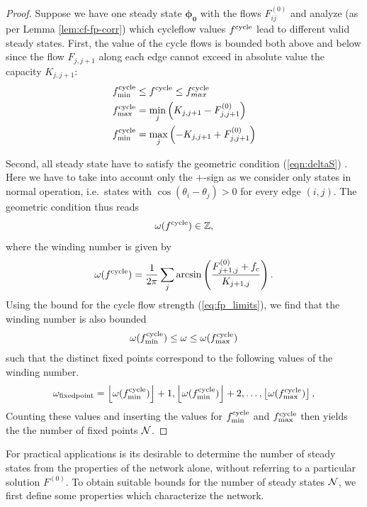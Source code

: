 \documentclass[10pt,aps,pre,preprint,superscriptaddress]{revtex4-1}
\newcommand{\be}{\begin{equation}}
\newcommand{\ee}{\end{equation}}
\newcommand{\N}{{\cal N}}
\renewcommand{\vec}[1]{\boldsymbol{#1}}
\newcommand{\floor}[1]{\left\lfloor #1 \right \rfloor}
\begin{document}
\begin{proof}
Suppose we have one steady state $\vec{\phi_0}$
with the flows $F_{ij}^{(0)}$ and analyze (as per Lemma \ref{lem:cf-fp-corr})
which cycleflow values $f^{\rm cycle}$ lead to different valid steady states. 
First, the value of the cycle flows is bounded both above and below
since the flow $F_{j,j+1}$ along each edge cannot exceed in 
absolute value the capacity $K_{j,j+1}$:
\begin{align}
  \label{eq:fp_limits}
  f^{\rm cycle}_{\min} & \leq f^{\rm cycle} \leq f^{\rm cycle}_{max}\\
  f^{\rm cycle}_{\max}&=\min_{j} \left(K_{j,j+1}-F^{(0)}_{j,j+1} \right)\\
  f^{\rm cycle}_{\min}&=\max_{j} \left(-K_{j,j+1}+F^{(0)}_{j,j+1} \right)\\
\end{align}

Second, all steady state have to satisfy the geometric condition (\ref{eqn:deltaS})  . 
Here we have to take into account only the $+$-sign as we consider only states in 
normal operation, i.e.~states with $\cos(\theta_i - \theta_j) > 0$ for every
edge $(i,j)$. The geometric condition thus reads
\be
    \omega(f^{\rm cycle}) \in \mathbb{Z},
\ee
where the winding number is given by
\be
   \omega(f^{\rm cycle}) = \frac{1}{2\pi} \sum_j\arcsin\left(\frac{F_{j+1,j}^{(0)}+f_c}{K_{j+1,j}}\right).
\ee
Using the bound for the cycle flow strength (\ref{eq:fp_limits}), we find that the winding 
number is also bounded
\begin{align}
   \omega(f^{\rm cycle}_{\min}) \le \omega \le \omega(f^{\rm cycle}_{\max})
  \label{eq:lim-omega}
\end{align}
such that the distinct fixed points correspond to the following values of the winding number. 
\be
    \omega_{\rm fixed point} = \floor{ \omega(f^{\rm cycle}_{\min}) } + 1,
           \floor{ \omega(f^{\rm cycle}_{\min})  } + 2, \ldots,
           \floor{ \omega(f^{\rm cycle}_{\max})  } ,
\ee
Counting these values and inserting the values for $f^{\rm cycle}_{\min}$
and $f^{\rm cycle}_{\max}$ then yields the the number of fixed points $\N$.
\end{proof}


For practical applications is its desirable to determine the number of steady states
from the properties of the network alone, without referring to a particular solution
$F^{(0)}$. To obtain suitable bounds for the number of steady states $\N$, we 
first define some properties which characterize the network.
\end{document}
